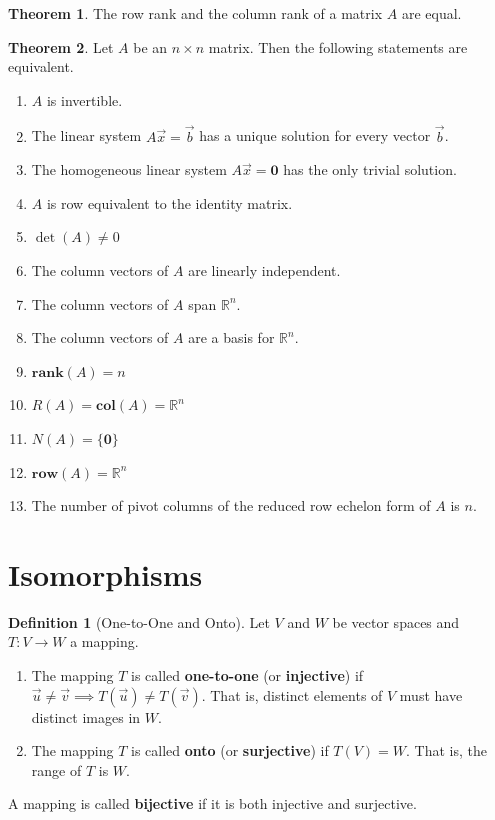 \documentclass{article}
\renewcommand{\bf}[1]{\textbf{#1}}
\theoremstyle{definition}
\newtheorem{theorem}{Theorem}
\newtheorem{definition}{Definition}
\newcommand{\reals}{\mathbb{R}}
\begin{document}
\begin{theorem}
	\label{rowcoleq}
	The row rank and the column rank of a matrix $A$ are equal.
\end{theorem}
\begin{theorem}
	\label{Aequivalencies}
	Let $A$ be an $n \times n$ matrix. Then the following statements are equivalent.
	\begin{enumerate}[font=\bfseries,itemsep=0pt]
		\item $A$ is invertible.
		\item The linear system $A\vec{x} = \vec{b}$ has a unique solution for every vector $\vec{b}$.
		\item The homogeneous linear system $A\vec{x} = \bf{0}$ has the only trivial solution.
		\item $A$ is row equivalent to the identity matrix.
		\item $\det(A) \neq 0$
		\item The column vectors of $A$ are linearly independent.
		\item The column vectors of $A$ span $\reals^n$.
		\item The column vectors of $A$ are a basis for $\reals^n$.
		\item $\bf{rank}(A) = n$
		\item $R(A) = \bf{col}(A) = \reals^n$
		\item $N(A) = \{\bf{0}\}$
		\item $\bf{row}(A) = \reals^n$
		\item The number of pivot columns of the reduced row echelon form of $A$ is $n$.
	\end{enumerate}
	\vspace{0.25em}
\end{theorem}

\section{Isomorphisms}
\begin{definition}[One-to-One and Onto]
	Let $V$ and $W$ be vector spaces and $T: V \rightarrow W$ a mapping.
	\begin{enumerate}[font=\bfseries,itemsep=0pt]
		\item The mapping $T$ is called \bf{one-to-one} (or \bf{injective}) if $\vec{u} \neq \vec{v} \implies T(\vec{u}) \neq T(\vec{v})$. That is, distinct elements of $V$ must have distinct images in $W$.
		\item The mapping $T$ is called \bf{onto} (or \bf{surjective}) if $T(V) = W$. That is, the range of $T$ is $W$.
	\end{enumerate}
	A mapping is called \bf{bijective} if it is both injective and surjective.
\end{definition}
\end{document}
